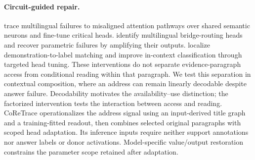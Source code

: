 \paragraph{Circuit-guided repair.}
\citet{sun2026bridging} trace multilingual failures to misaligned attention pathways over shared semantic neurons and fine-tune critical heads. \citet{kim2026bridge} identify multilingual bridge-routing heads and recover parametric failures by amplifying their outputs. \citet{sun2025mappings} localize demonstration-to-label matching and improve in-context classification through targeted head tuning. These interventions do not separate evidence-paragraph access from conditional reading within that paragraph. We test this separation in contextual composition, where an address can remain linearly decodable despite answer failure. Decodability motivates the availability--use distinction; the factorized intervention tests the interaction between access and reading. CoReTrace operationalizes the address signal using an input-derived title graph and a training-fitted readout, then combines selected original paragraphs with scoped head adaptation. Its inference inputs require neither support annotations nor answer labels or donor activations. Model-specific value/output restoration constrains the parameter scope retained after adaptation.
